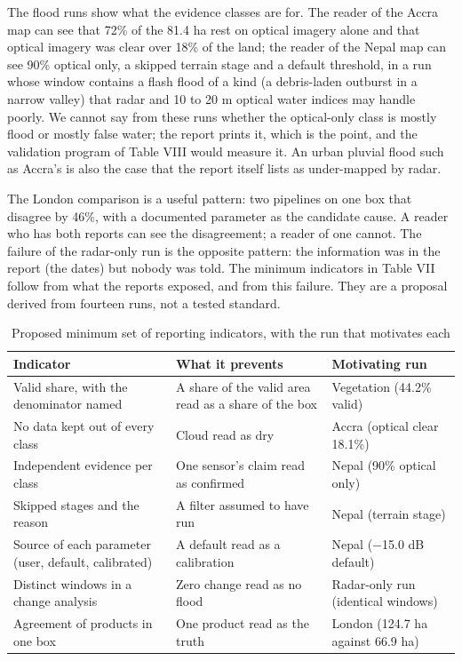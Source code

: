\documentclass[conference]{IEEEtran}
\newlength{\tabw}
\begin{document}
The flood runs show what the evidence classes are for. The reader of the Accra map can see that 72\% of the 81.4 ha rest on optical imagery alone and that optical imagery was clear over 18\% of the land; the reader of the Nepal map can see 90\% optical only, a skipped terrain stage and a default threshold, in a run whose window contains a flash flood of a kind (a debris-laden outburst in a narrow valley) that radar and 10 to 20 m optical water indices may handle poorly. We cannot say from these runs whether the optical-only class is mostly flood or mostly false water; the report prints it, which is the point, and the validation program of Table VIII would measure it. An urban pluvial flood such as Accra's is also the case that the report itself lists as under-mapped by radar.

The London comparison is a useful pattern: two pipelines on one box that disagree by 46\%, with a documented parameter as the candidate cause. A reader who has both reports can see the disagreement; a reader of one cannot. The failure of the radar-only run is the opposite pattern: the information was in the report (the dates) but nobody was told. The minimum indicators in Table VII follow from what the reports exposed, and from this failure. They are a proposal derived from fourteen runs, not a tested standard.

\begin{table}[!t]
\caption{Proposed minimum set of reporting indicators, with the run that motivates each}
\centering
{\footnotesize\setlength{\tabcolsep}{2.5pt}\renewcommand{\arraystretch}{1.12}\setlength{\tabw}{\dimexpr\textwidth-6\tabcolsep\relax}
\begin{tabular}{>{\raggedright\arraybackslash}p{}>{\raggedright\arraybackslash}p{}>{\raggedright\arraybackslash}p{}}
\toprule
\textbf{Indicator} & \textbf{What it prevents} & \textbf{Motivating run} \\
\midrule
Valid share, with the denominator named & A share of the valid area read as a share of the box & Vegetation (44.2\% valid) \\
No data kept out of every class & Cloud read as dry & Accra (optical clear 18.1\%) \\
Independent evidence per class & One sensor's claim read as confirmed & Nepal (90\% optical only) \\
Skipped stages and the reason & A filter assumed to have run & Nepal (terrain stage) \\
Source of each parameter (user, default, calibrated) & A default read as a calibration & Nepal ($-$15.0 dB default) \\
Distinct windows in a change analysis & Zero change read as no flood & Radar-only run (identical windows) \\
Agreement of products in one box & One product read as the truth & London (124.7 ha against 66.9 ha) \\
\bottomrule
\end{tabular}
}
\end{table}
\end{document}
